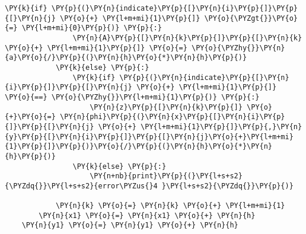 \begin{tcolorbox}[breakable, size=fbox, boxrule=1pt, pad at break*=1mm,colback=cellbackground, colframe=cellborder]
\begin{Verbatim}[commandchars=\\\{\}]
            \PY{k}{if} \PY{p}{(}\PY{n}{indicate}\PY{p}{[}\PY{n}{i}\PY{p}{]}\PY{p}{[}\PY{n}{j} \PY{o}{+} \PY{l+m+mi}{1}\PY{p}{]} \PY{o}{\PYZgt{}}\PY{o}{=} \PY{l+m+mi}{0}\PY{p}{)} \PY{p}{:}
                \PY{n}{A}\PY{p}{[}\PY{n}{k}\PY{p}{]}\PY{p}{[}\PY{n}{k} \PY{o}{+} \PY{l+m+mi}{1}\PY{p}{]} \PY{o}{=} \PY{o}{\PYZhy{}}\PY{n}{a}\PY{o}{/}\PY{p}{(}\PY{n}{h}\PY{o}{*}\PY{n}{h}\PY{p}{)}
            \PY{k}{else} \PY{p}{:}
                \PY{k}{if} \PY{p}{(}\PY{n}{indicate}\PY{p}{[}\PY{n}{i}\PY{p}{]}\PY{p}{[}\PY{n}{j} \PY{o}{+} \PY{l+m+mi}{1}\PY{p}{]} \PY{o}{==} \PY{o}{\PYZhy{}}\PY{l+m+mi}{1}\PY{p}{)} \PY{p}{:}
                    \PY{n}{z}\PY{p}{[}\PY{n}{k}\PY{p}{]} \PY{o}{+}\PY{o}{=} \PY{n}{phi}\PY{p}{(}\PY{n}{x}\PY{p}{[}\PY{n}{i}\PY{p}{]}\PY{p}{[}\PY{n}{j} \PY{o}{+} \PY{l+m+mi}{1}\PY{p}{]}\PY{p}{,}\PY{n}{y}\PY{p}{[}\PY{n}{i}\PY{p}{]}\PY{p}{[}\PY{n}{j}\PY{o}{+}\PY{l+m+mi}{1}\PY{p}{]}\PY{p}{)}\PY{o}{/}\PY{p}{(}\PY{n}{h}\PY{o}{*}\PY{n}{h}\PY{p}{)}
                \PY{k}{else} \PY{p}{:}
                    \PY{n+nb}{print}\PY{p}{(}\PY{l+s+s2}{\PYZdq{}}\PY{l+s+s2}{error\PYZus{}4 }\PY{l+s+s2}{\PYZdq{}}\PY{p}{)}
                    
            \PY{n}{k} \PY{o}{=} \PY{n}{k} \PY{o}{+} \PY{l+m+mi}{1}
        \PY{n}{x1} \PY{o}{=} \PY{n}{x1} \PY{o}{+} \PY{n}{h}
    \PY{n}{y1} \PY{o}{=} \PY{n}{y1} \PY{o}{+} \PY{n}{h}
    
\end{Verbatim}
\end{tcolorbox}

